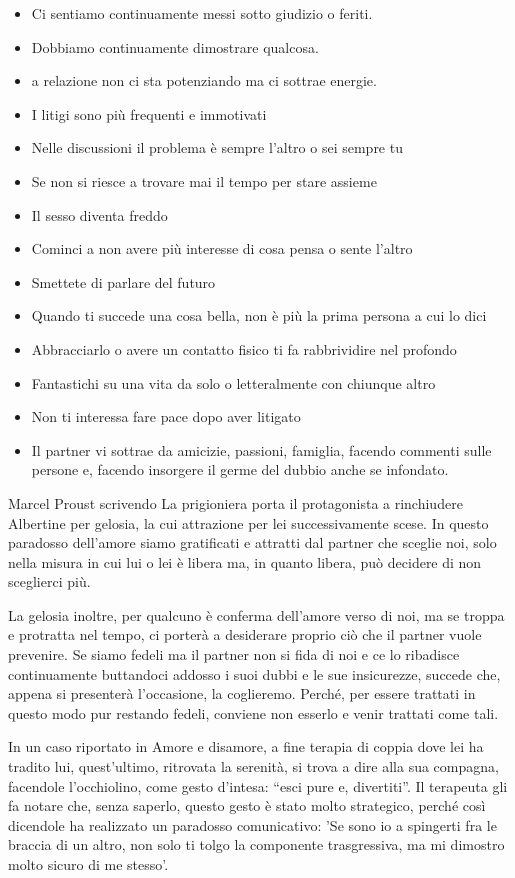 \documentclass[12pt]{book} %
\begin{document}
\begin{itemize}
\item Ci sentiamo continuamente messi sotto giudizio o feriti.
\item Dobbiamo continuamente dimostrare qualcosa.
\item a relazione non ci sta potenziando ma ci sottrae energie.
\item I litigi sono più frequenti e immotivati 
\item Nelle discussioni il problema è sempre l'altro o sei sempre tu
\item Se non si riesce a trovare mai il tempo per stare assieme 
\item Il sesso diventa freddo
\item Cominci a non avere più interesse di cosa pensa o sente l'altro
\item Smettete di parlare del futuro
\item Quando ti succede una cosa bella, non è più la prima persona a cui lo dici
\item Abbracciarlo o avere un contatto fisico ti fa rabbrividire nel profondo
\item Fantastichi su una vita da solo o letteralmente con chiunque altro
\item Non ti interessa fare pace dopo aver litigato
\item Il partner vi sottrae da amicizie, passioni, famiglia, facendo commenti sulle persone e, facendo insorgere il germe del dubbio anche se infondato.
\end{itemize}

\begin{mdframed}[linewidth=1pt]
Marcel Proust scrivendo La prigioniera porta il protagonista a rinchiudere Albertine per gelosia, la cui attrazione per
lei successivamente scese. In questo paradosso dell'amore siamo gratificati e attratti dal partner
che sceglie noi, solo nella misura in cui lui o lei è libera ma, in quanto libera, può decidere di non sceglierci più.

La gelosia inoltre, per qualcuno è conferma dell'amore verso di noi, ma se troppa e protratta nel
tempo, ci porterà a desiderare proprio ciò che il partner vuole prevenire. Se siamo fedeli ma il partner non si fida di
noi e ce lo ribadisce continuamente buttandoci addosso i suoi dubbi e le sue insicurezze, succede che, appena si
presenterà l'occasione, la coglieremo. Perché, per essere trattati in questo modo pur restando
fedeli, conviene non esserlo e venir trattati come tali.

In un caso riportato in Amore e disamore, a fine terapia di coppia dove
lei ha tradito lui, quest'ultimo, ritrovata la serenità, si trova a dire alla sua compagna,
facendole l'occhiolino, come gesto d'intesa: “esci pure e, divertiti”. Il
terapeuta gli fa notare che, senza saperlo, questo gesto è stato molto strategico, perché così dicendole ha realizzato
un paradosso comunicativo: 'Se sono io a spingerti fra le braccia di un altro, non solo ti tolgo
la componente trasgressiva, ma mi dimostro molto sicuro di me stesso'.
\end{mdframed}
\end{document}
